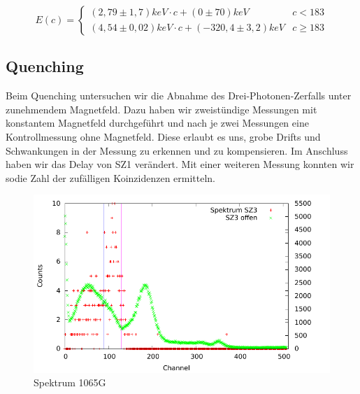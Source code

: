 \begin{equation}
 E(c) = \begin{cases}
 ( 2,79 \pm 1,7) keV \cdot c + (0 \pm 70) keV & c < 183 \\
 (4,54 \pm 0,02) keV \cdot c + (-320,4 \pm 3,2) keV & c \geq 183
 \end{cases}
\end{equation}


\subsection{Quenching}

Beim Quenching untersuchen wir die Abnahme des Drei-Photonen-Zerfalls unter zunehmendem Magnetfeld. Dazu haben wir zweistündige Messungen mit konstantem Magnetfeld durchgeführt und nach je zwei Messungen eine Kontrollmessung ohne Magnetfeld. Diese erlaubt es uns, grobe Drifts und Schwankungen in der Messung zu erkennen und zu kompensieren. Im Anschluss haben wir das Delay von SZ1 verändert. Mit einer weiteren Messung konnten wir sodie Zahl der zufälligen Koinzidenzen ermitteln.


\begin{figure}
 \includegraphics[width=\textwidth]{Graphen/quench/spektrum_1065.pdf}
 \caption{Spektrum 1065G}
\end{figure}


% 
% 
% 

